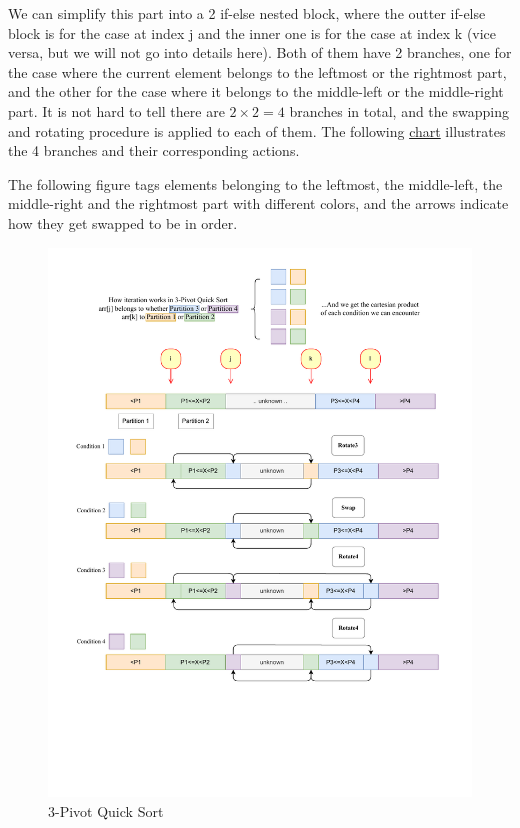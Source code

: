 \documentclass{article}
\begin{document}
We can simplify this part into a 2 if-else nested block, where the outter if-else block is for the case at index j and the inner one is for the case at index k (vice versa, but we will not go into details here).
Both of them have 2 branches, one for the case where the current element belongs to the leftmost or the rightmost part, and the other for the case where it belongs to the middle-left or the middle-right part.
It is not hard to tell there are $2 \times 2 = 4$ branches in total, and the swapping and rotating procedure is applied to each of them. The following \hyperlink{fig:3pivot}{chart} illustrates the 4 branches and their corresponding actions.

The following figure tags elements belonging to the leftmost, the middle-left, the middle-right and the rightmost part with different colors, and the arrows indicate how they get swapped to be in order.

\begin{figure}[H]
    \hypertarget{fig:3pivot}{}
    \caption{3-Pivot Quick Sort}
    \centering
    \hspace*{-0.25\textwidth}
    \includegraphics[width=1.5\textwidth]{3pivot.drawio.pdf}
\end{figure}
\end{document}
